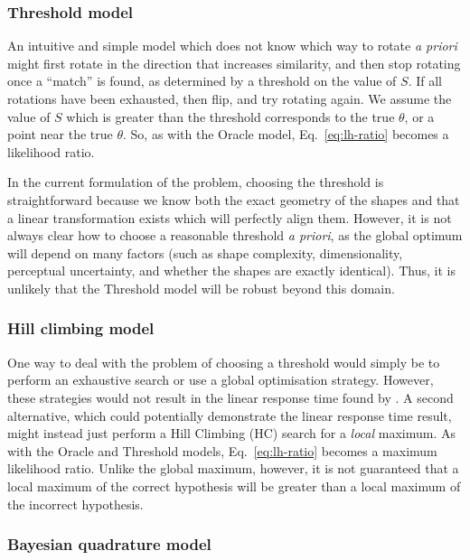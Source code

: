 \documentclass[10pt,letterpaper]{article}
\newcommand{\Oc}[0]{Oracle}
\newcommand{\Th}[0]{Threshold}
\newcommand{\Hc}[0]{HC}
\begin{document}
\subsubsection{Threshold model}

An intuitive and simple model which does not know which way to rotate
\textit{a priori} might first rotate in the direction that increases
similarity, and then stop rotating once a ``match'' is found, as
determined by a threshold on the value of $S$. If all rotations have
been exhausted, then flip, and try rotating again. We assume the value
of $S$ which is greater than the threshold corresponds to the true
$\theta$, or a point near the true $\theta$. So, as with the \Oc{}
model, Eq.~\ref{eq:lh-ratio} becomes a likelihood ratio.

In the current formulation of the problem, choosing the threshold is
straightforward because we know both the exact geometry of the shapes
and that a linear transformation exists which will perfectly align
them. However, it is not always clear how to choose a reasonable
threshold \textit{a priori}, as the global optimum will depend on many
factors (such as shape complexity, dimensionality, perceptual
uncertainty, and whether the shapes are exactly identical). Thus, it
is unlikely that the \Th{} model will be robust beyond this domain.

\subsubsection{Hill climbing model}

One way to deal with the problem of choosing a threshold would simply
be to perform an exhaustive search or use a global optimisation
strategy. However, these strategies would not result in the linear
response time found by . A second alternative,
which could potentially demonstrate the linear response time result,
might instead just perform a Hill Climbing (\Hc{}) search for a
\textit{local} maximum. As with the \Oc{} and \Th{} models,
Eq.~\ref{eq:lh-ratio} becomes a maximum likelihood ratio. Unlike the
global maximum, however, it is not guaranteed that a local maximum of
the correct hypothesis will be greater than a local maximum of the
incorrect hypothesis.

\subsubsection{Bayesian quadrature model}
\end{document}
